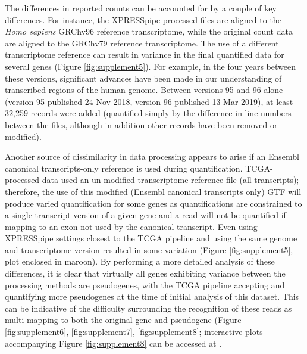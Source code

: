 \documentclass[10pt, oneside]{article}
\begin{document}
\begin{multicols}{2}
The differences in reported counts can be accounted for by a couple of key differences. For instance, the XPRESSpipe-processed files are aligned to the \textit{Homo sapiens} GRChv96 reference transcriptome, while the original count data are aligned to the GRChv79 reference transcriptome. The use of a different transcriptome reference can result in variance in the final quantified data for several genes (Figure \ref{fig:supplement5}). For example, in the four years between these versions, significant advances have been made in our understanding of transcribed regions of the human genome. Between versions 95 and 96 alone (version 95 published 24 Nov 2018, version 96 published 13 Mar 2019), at least 32,259 records were added (quantified simply by the difference in line numbers between the files, although in addition other records have been removed or modified). \par

Another source of dissimilarity in data processing appears to arise if an Ensembl canonical transcripts-only reference is used during quantification. TCGA-processed data used an un-modified transcriptome reference file (all transcripts); therefore, the use of this modified (Ensembl canonical transcripts only) GTF will produce varied quantification for some genes as quantifications are constrained to a single transcript version of a given gene and a read will not be quantified if mapping to an exon not used by the canonical transcript. Even using XPRESSpipe settings closest to the TCGA pipeline and using the same genome and transcriptome version resulted in some variation (Figure \ref{fig:supplement5}, plot enclosed in maroon). By performing a more detailed analysis of these differences, it is clear that virtually all genes exhibiting variance between the processing methods are pseudogenes, with the TCGA pipeline accepting and quantifying more pseudogenes at the time of initial analysis of this dataset. This can be indicative of the difficulty surrounding the recognition of these reads as multi-mapping to both the original gene and pseudogene (Figure \ref{fig:supplement6}, \ref{fig:supplement7}, \ref{fig:supplement8}; interactive plots accompanying Figure \ref{fig:supplement8} can be accessed at \cite{manuscript}. \par



\end{multicols}
\end{document}
